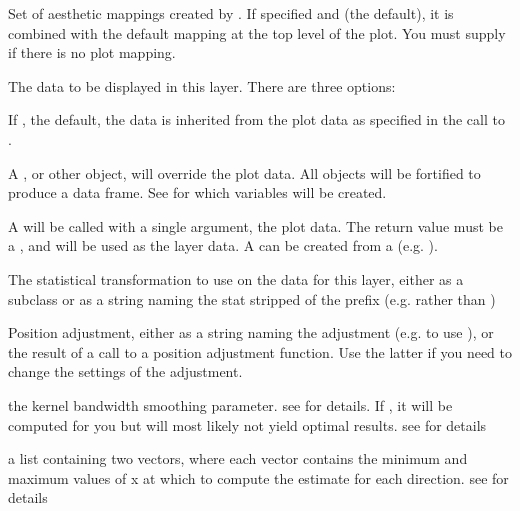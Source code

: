 \documentclass[a4paper]{book}
\begin{document}
%
\begin{Arguments}
\begin{ldescription}
\item[\code{mapping}] Set of aesthetic mappings created by . If specified and
 (the default), it is combined with the default mapping
at the top level of the plot. You must supply  if there is no plot
mapping.

\item[\code{data}] The data to be displayed in this layer. There are three
options:

If , the default, the data is inherited from the plot
data as specified in the call to .

A , or other object, will override the plot
data. All objects will be fortified to produce a data frame. See
 for which variables will be created.

A  will be called with a single argument,
the plot data. The return value must be a , and
will be used as the layer data. A  can be created
from a  (e.g. ).

\item[\code{stat}] The statistical transformation to use on the data for this
layer, either as a   subclass or as a string naming the
stat stripped of the  prefix (e.g.  rather than
)

\item[\code{position}] Position adjustment, either as a string naming the adjustment
(e.g.  to use ), or the result of a call to a
position adjustment function. Use the latter if you need to change the
settings of the adjustment.

\item[\code{bandwidth}] the kernel bandwidth smoothing parameter. see
 for details. If ,
it will be computed for you but will most likely not yield optimal
results. see  for details

\item[\code{range.x}] a list containing two vectors, where each vector contains the
minimum and maximum values of x at which to compute the estimate for
each direction. see  for details


\end{ldescription}
\end{Arguments}
\end{document}
